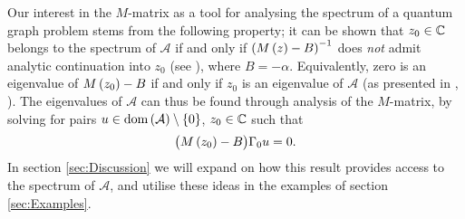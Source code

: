 Our interest in the $M$-matrix as a tool for analysing the spectrum of a quantum graph problem stems from the following property; it can be shown that $z_0\in\mathbb{C}$ belongs to the spectrum of $\mathcal{A}$ if and only if $\left( M\left( z \right) - B \right)^{-1}$ does \emph{not} admit analytic continuation into $z_0$ (see \cite[Theorem 2.1]{ershova2014isospectrality}), where $B=-\alpha$.
Equivalently, zero is an eigenvalue of $M\left( z_0 \right)-B$ if and only if $z_0$ is an eigenvalue of $\mathcal{A}$ (as presented in \cite[Proposition 1]{derkach1991generalized}, \cite[page 698]{cherednichenko2019time}).
The eigenvalues of $\mathcal{A}$ can thus be found through analysis of the $M$-matrix, by solving for pairs $u\in\mathrm{dom}\left( \mathcal{A} \right)\setminus\left\{ 0 \right\}$, $z_0\in\mathbb{C}$ such that
\begin{align*}
	\bigl( M\left( z_0 \right) - B \bigr) \Gamma_0 u = 0.
\end{align*}
In section \ref{sec:Discussion} we will expand on how this result provides access to the spectrum of $\mathcal{A}$, and utilise these ideas in the examples of section \ref{sec:Examples}.

